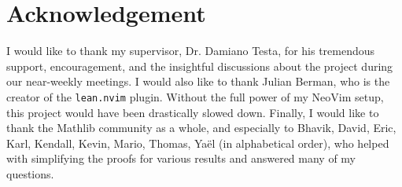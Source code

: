 \section{Acknowledgement}

I would like to thank my supervisor, Dr. Damiano Testa, for his tremendous support, encouragement, and the insightful discussions about the project during our near-weekly meetings. I would also like to thank Julian Berman, who is the creator of the \texttt{lean.nvim} plugin. Without the full power of my NeoVim setup, this project would have been drastically slowed down. Finally, I would like to thank the Mathlib community as a whole, and especially to Bhavik, David, Eric, Karl, Kendall, Kevin, Mario, Thomas, Yaël (in alphabetical order), who helped with simplifying the proofs for various results and answered many of my questions.
